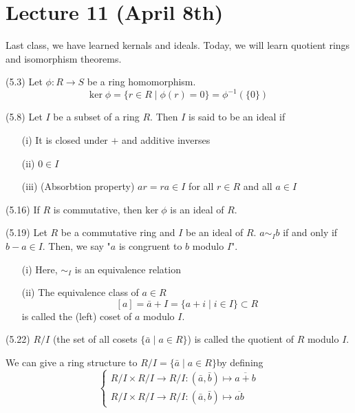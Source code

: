 \section{Lecture 11 (April 8th)}
Last class, we have learned kernals and ideals. Today, we will learn quotient rings and isomorphism theorems. 
\begin{defi}
(5.3) Let $\phi :R\rightarrow S$ be a ring homomorphism. 
\[\mathrm{ker}\;\phi =\{r\in R \;|\; \phi (r)=0\}=\phi ^{-1}(\{0\})\]
\end{defi}
\vspace{2ex}
\begin{defi}
(5.8) Let $I$ be a subset of a ring $R$. Then $I$ is said to be an ideal if
\begin{itemize}
\item[(i)] It is closed under $+$ and additive inverses
\item[(ii)] $0\in I$
\item[(iii)] (Absorbtion property) $ar=ra\in I$ for all $r\in R$ and all $a\in I$
\end{itemize}
\end{defi}
\vspace{2ex}
\begin{prop}
(5.16) If $R$ is commutative, then $\mathrm{ker}\;\phi $ is an ideal of $R$.
\end{prop}
\vspace{2ex}
\begin{defi}
(5.19) Let $R$ be a commutative ring and $I$ be an ideal of $R$. $a\sim_{I}b$ if and only if $b-a\in I$. Then, we say "$a$ is congruent to $b$ modulo $I$". 
\end{defi}
\vspace{2ex}
\begin{rmk}
\begin{itemize}
\item[(i)] Here, $\sim_{I}$ is an equivalence relation
\item[(ii)] The equivalence class of $a\in R$
\[[a]=\bar{a}+I=\{a+i \;|\; i\in I\}\subset R\]
is called the (left) coset of $a$ modulo $I$.
\end{itemize}
\end{rmk}
\vspace{2ex}
\begin{defi}
(5.22) $R/I$ (the set of all cosets $\{\bar{a} \;|\; a\in R\}$) is called the quotient of $R$ modulo $I$. 
\end{defi}
\vspace{2ex}
\begin{rmk}
We can give a ring structure to $R/I=\{\bar{a} \;|\; a\in R\}$by defining 
\[\begin{cases}
R/I\times R/I\rightarrow R/I:(\bar{a},\bar{b})\mapsto \overline{a+b}\\
R/I\times R/I\rightarrow R/I:(\bar{a},\bar{b})\mapsto \overline{ab}
\end{cases}\]
\end{rmk}

